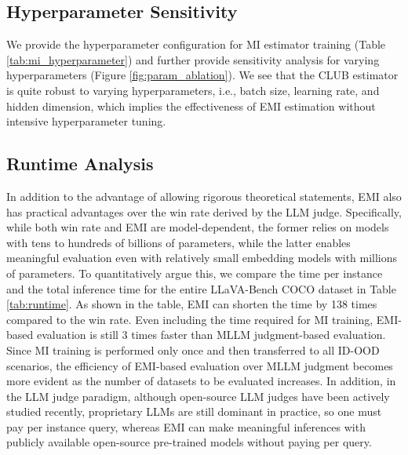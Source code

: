 \subsection{Hyperparameter Sensitivity}
We provide the hyperparameter configuration for MI estimator training (Table \ref{tab:mi_hyperparameter}) and further provide sensitivity analysis for varying hyperparameters (Figure \ref{fig:param_ablation}). We see that the CLUB estimator is quite robust to varying hyperparameters, i.e., batch size, learning rate, and hidden dimension, which implies the effectiveness of EMI estimation without intensive hyperparameter tuning.



\subsection{Runtime Analysis} \label{appendix:experiment:practical}

In addition to the advantage of allowing rigorous theoretical statements, EMI also has practical advantages over the win rate derived by the LLM judge. Specifically, while both win rate and EMI are model-dependent, the former relies on models with tens to hundreds of billions of parameters, while the latter enables meaningful evaluation even with relatively small embedding models with millions of parameters. To quantitatively argue this, we compare the time per instance and the total inference time for the entire LLaVA-Bench COCO dataset in Table \ref{tab:runtime}. As shown in the table, EMI can shorten the time by 138 times compared to the win rate. Even including the time required for MI training, EMI-based evaluation is still 3 times faster than MLLM judgment-based evaluation. Since MI training is performed only once and then transferred to all ID-OOD scenarios, the efficiency of EMI-based evaluation over MLLM judgment becomes more evident as the number of datasets to be evaluated increases.
In addition, in the LLM judge paradigm, although open-source LLM judges \cite{kim2023prometheus} have been actively studied recently, proprietary LLMs are still dominant in practice, so one must pay per instance query, whereas EMI can make meaningful inferences with publicly available open-source pre-trained models without paying per query.